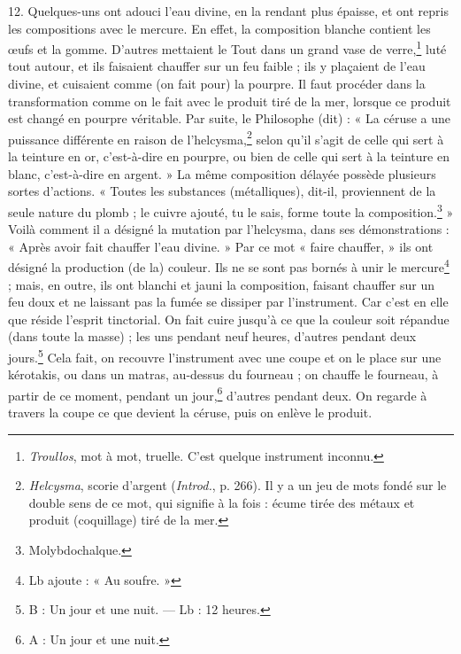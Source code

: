 \documentclass[landscape, a4paper, 11pt, oneside, polutonikogreek, french]{article}
\begin{document}
12. Quelques-uns ont adouci l'eau divine, en la rendant plus épaisse, et ont repris les compositions avec le mercure. En effet, la composition blanche contient les œufs et la gomme. D'autres mettaient le Tout dans un grand vase de verre,\footnote{\emph{Troullos}, mot à mot, truelle. C'est quelque instrument inconnu.} luté tout autour, et ils faisaient chauffer sur un feu faible ; ils y plaçaient de l'eau divine, et cuisaient comme (on fait pour) la pourpre. Il faut procéder dans la transformation comme on le fait avec le produit tiré de la mer, lorsque ce produit est changé en pourpre véritable. Par suite, le Philosophe (dit) : « La céruse a une puissance différente en raison de l'helcysma,\footnote{\emph{Helcysma}, scorie d'argent (\emph{Introd.}, p. 266). Il y a un jeu de mots fondé sur le double sens de ce mot, qui signifie à la fois : écume tirée des métaux et produit (coquillage) tiré de la mer.} selon qu'il s'agit de celle qui sert à la teinture en or, c'est-à-dire en pourpre, ou bien de celle qui sert à la teinture en blanc, c'est-à-dire en argent. » La même composition délayée possède plusieurs sortes d'actions. « Toutes les substances (métalliques), dit-il, proviennent de la seule nature du plomb ; le cuivre ajouté, tu le sais, forme toute la composition.\footnote{Molybdochalque.} » Voilà comment il a désigné la mutation par l'helcysma, dans ses démonstrations : « Après avoir fait chauffer l'eau divine. » Par ce mot « faire chauffer, » ils ont désigné la production (de la) couleur. Ils ne se sont pas bornés à unir le mercure\footnote{Lb ajoute : « Au soufre. »} ; mais, en outre, ils ont blanchi et jauni la composition, faisant chauffer sur un feu doux et ne laissant pas la fumée se dissiper par l'instrument. Car c'est en elle que réside l'esprit tinctorial. On fait cuire jusqu'à ce que la couleur soit répandue (dans toute la masse) ; les uns pendant neuf heures, d'autres pendant deux jours.\footnote{B : Un jour et une nuit. --- Lb : 12 heures.} Cela fait, on recouvre l'instrument avec une coupe et on le place sur une kérotakis, ou dans un matras, au-dessus du fourneau ; on chauffe le fourneau, à partir de ce moment, pendant un jour,\footnote{A : Un jour et une nuit.} d'autres pendant deux. On regarde à travers la coupe ce que devient la céruse, puis on enlève le produit.
\end{document}
